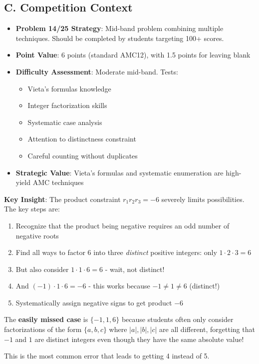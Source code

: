 \documentclass[12pt]{article}
\begin{document}
\begin{competitionbox}
\subsection*{C. Competition Context}
\begin{itemize}[leftmargin=*]
    \item \textbf{Problem 14/25 Strategy}: Mid-band problem combining multiple techniques. Should be completed by students targeting 100+ scores.
    \item \textbf{Point Value}: 6 points (standard AMC12), with 1.5 points for leaving blank
    \item \textbf{Difficulty Assessment}: Moderate mid-band. Tests:
    \begin{itemize}
        \item Vieta's formulas knowledge
        \item Integer factorization skills
        \item Systematic case analysis
        \item Attention to distinctness constraint
        \item Careful counting without duplicates
    \end{itemize}
    \item \textbf{Strategic Value}: Vieta's formulas and systematic enumeration are high-yield AMC techniques
\end{itemize}
\end{competitionbox}

\begin{keyinsightbox}
\textbf{Key Insight}: The product constraint $r_1 r_2 r_3 = -6$ severely limits possibilities. The key steps are:

\begin{enumerate}
    \item Recognize that the product being negative requires an odd number of negative roots
    \item Find all ways to factor 6 into three \emph{distinct} positive integers: only $1 \cdot 2 \cdot 3 = 6$
    \item But also consider $1 \cdot 1 \cdot 6 = 6$ - wait, not distinct!
    \item And $(-1) \cdot 1 \cdot 6 = -6$ - this works because $-1 \neq 1 \neq 6$ (distinct!)
    \item Systematically assign negative signs to get product $-6$
\end{enumerate}

The \textbf{easily missed case} is $\{-1, 1, 6\}$ because students often only consider factorizations of the form $\{a, b, c\}$ where $|a|, |b|, |c|$ are all different, forgetting that $-1$ and $1$ are distinct integers even though they have the same absolute value!

This is the most common error that leads to getting 4 instead of 5.
\end{keyinsightbox}
\end{document}
